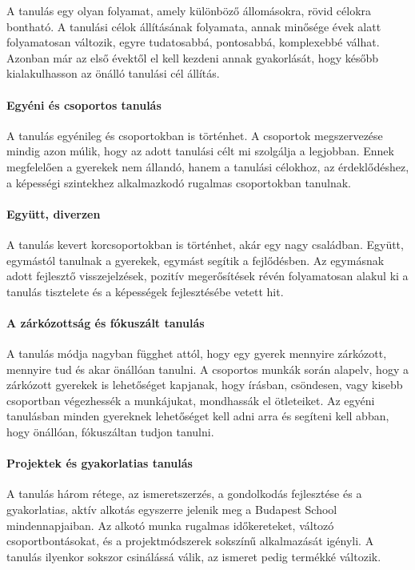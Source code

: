 A tanulás egy olyan folyamat, amely különböző állomásokra, rövid célokra
bontható. A tanulási célok állításának folyamata, annak minősége évek
alatt folyamatosan változik, egyre tudatosabbá, pontosabbá, komplexebbé
válhat. Azonban már az első évektől el kell kezdeni annak gyakorlását,
hogy később kialakulhasson az önálló tanulási cél állítás.

\paragraph{Egyéni és csoportos
      tanulás}

A tanulás egyénileg és csoportokban is történhet. A csoportok
megszervezése mindig azon múlik, hogy az adott tanulási célt mi
szolgálja a legjobban. Ennek megfelelően a gyerekek nem állandó, hanem a
tanulási célokhoz, az érdeklődéshez, a képességi szintekhez alkalmazkodó
rugalmas csoportokban tanulnak.

\paragraph{Együtt, diverzen}

A tanulás kevert korcsoportokban is történhet, akár egy nagy családban. Együtt,
egymástól tanulnak a gyerekek, egymást segítik a fejlődésben. Az egymásnak
adott fejlesztő visszejelzések, pozitív megerősítések révén folyamatosan alakul
ki a tanulás tisztelete és a képességek fejlesztésébe vetett hit.

\paragraph{A zárkózottság és fókuszált
      tanulás}

A tanulás módja nagyban függhet attól, hogy egy gyerek mennyire
zárkózott, mennyire tud és akar önállóan tanulni. A csoportos munkák
során alapelv, hogy a zárkózott gyerekek is lehetőséget kapjanak, hogy
írásban, csöndesen, vagy kisebb csoportban végezhessék a munkájukat,
mondhassák el ötleteiket. Az egyéni tanulásban minden gyereknek
lehetőséget kell adni arra és segíteni kell abban, hogy önállóan,
fókuszáltan tudjon tanulni.

\paragraph{Projektek és gyakorlatias tanulás}

A tanulás három rétege, az ismeretszerzés, a gondolkodás fejlesztése és
a gyakorlatias, aktív alkotás egyszerre jelenik meg a Budapest School
mindennapjaiban. Az alkotó munka rugalmas időkereteket, változó
csoportbontásokat, és a projektmódszerek sokszínű alkalmazását igényli.
A tanulás ilyenkor sokszor csinálássá válik, az ismeret pedig termékké
változik.

